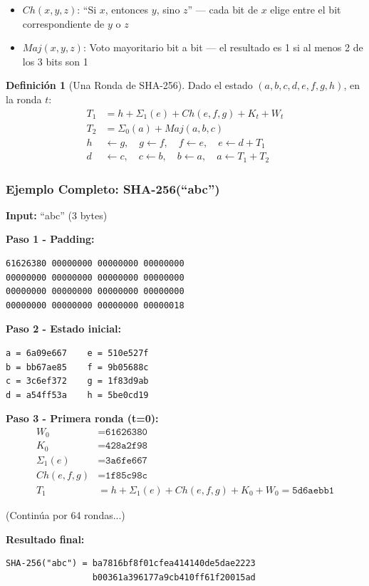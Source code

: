 \documentclass[11pt,a4paper,twoside,openright]{book}
\theoremstyle{definition}
\newtheorem{definition}{Definición}[chapter]
\theoremstyle{plain}
\theoremstyle{remark}
\begin{document}
\begin{intuicion}
\begin{itemize}
    \item $Ch(x,y,z)$: ``Si $x$, entonces $y$, sino $z$'' --- cada bit de $x$ elige entre el bit correspondiente de $y$ o $z$
    \item $Maj(x,y,z)$: Voto mayoritario bit a bit --- el resultado es 1 si al menos 2 de los 3 bits son 1
\end{itemize}
\end{intuicion}

\begin{definition}[Una Ronda de SHA-256]
Dado el estado $(a, b, c, d, e, f, g, h)$, en la ronda $t$:
\begin{align}
T_1 &= h + \Sigma_1(e) + Ch(e, f, g) + K_t + W_t \\
T_2 &= \Sigma_0(a) + Maj(a, b, c) \\
h &\leftarrow g, \quad g \leftarrow f, \quad f \leftarrow e, \quad e \leftarrow d + T_1 \\
d &\leftarrow c, \quad c \leftarrow b, \quad b \leftarrow a, \quad a \leftarrow T_1 + T_2
\end{align}
\end{definition}

\subsubsection{Ejemplo Completo: SHA-256(``abc'')}

\begin{ejemplo}
\textbf{Input:} ``abc'' (3 bytes)

\textbf{Paso 1 - Padding:}
\begin{verbatim}
61626380 00000000 00000000 00000000
00000000 00000000 00000000 00000000
00000000 00000000 00000000 00000000
00000000 00000000 00000000 00000018
\end{verbatim}

\textbf{Paso 2 - Estado inicial:}
\begin{verbatim}
a = 6a09e667    e = 510e527f
b = bb67ae85    f = 9b05688c
c = 3c6ef372    g = 1f83d9ab
d = a54ff53a    h = 5be0cd19
\end{verbatim}

\textbf{Paso 3 - Primera ronda (t=0):}
\begin{align}
W_0 &= \texttt{61626380} \\
K_0 &= \texttt{428a2f98} \\
\Sigma_1(e) &= \texttt{3a6fe667} \\
Ch(e,f,g) &= \texttt{1f85c98c} \\
T_1 &= h + \Sigma_1(e) + Ch(e,f,g) + K_0 + W_0 = \texttt{5d6aebb1}
\end{align}

(Continúa por 64 rondas...)

\textbf{Resultado final:}
\begin{verbatim}
SHA-256("abc") = ba7816bf8f01cfea414140de5dae2223
                 b00361a396177a9cb410ff61f20015ad
\end{verbatim}
\end{ejemplo}
\end{document}
